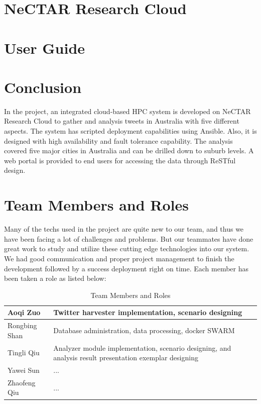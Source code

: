 \documentclass{article}
\begin{document}
\section{NeCTAR Research Cloud}

\section{User Guide}

\section{Conclusion}
In the project, an integrated cloud-based HPC system is developed on NeCTAR Research Cloud to gather and analysis tweets in Australia with five different aspects. The system has scripted deployment capabilities using Ansible. Also, it is designed with high availability and fault tolerance capability. The analysis covered five major cities in Australia and can be drilled down to suburb levels.  A web portal is provided to end users for accessing the data through ReSTful design.
\section{Team Members and Roles}
Many of the techs used in the project are quite new to our team, and thus we have been facing a lot of challenges and problems. But our teammates have done great work to study and utilize these cutting edge technologies into our system. We had good communication and proper project management to finish the development followed by a success deployment right on time. Each member has been taken a role as listed below:
\begin{table}[]
    \centering
    \begin{tabular}{l|p{13cm}}
    \hline
    Aoqi Zuo & Twitter harvester implementation, scenario designing \\
    \hline
    Rongbing Shan & Database administration, data processing, docker SWARM  \\
    \hline
    Tingli Qiu & Analyzer module implementation, scenario designing, and analysis result presentation exemplar designing \\
    \hline
    Yawei Sun & ... \\
    \hline
    Zhaofeng Qiu & ...\\
    \hline
    \end{tabular}
    \caption{Team Members and Roles}
    \label{tab:my_label}
\end{table}
\end{document}
